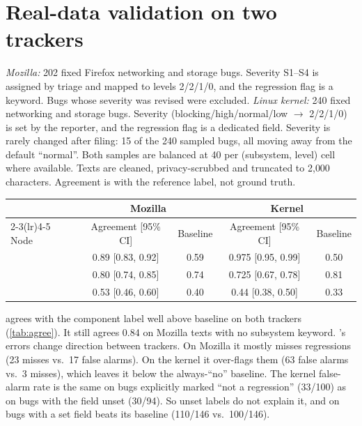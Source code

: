 \section{Real-data validation on two trackers}
\label{sec:real}

 \emph{Mozilla:} 202 fixed Firefox networking and
storage bugs. Severity S1--S4 is assigned by triage and mapped to levels
2/2/1/0, and the regression flag is a keyword. Bugs whose severity was
revised were excluded. \emph{Linux kernel:} 240 fixed networking and
storage bugs. Severity (blocking/high/normal/low $\to$ 2/2/1/0) is set by
the reporter, and the regression flag is a dedicated field. Severity is
rarely changed after filing: 15 of the 240 sampled bugs, all moving away
from the default ``normal''. Both samples are
balanced at 40 per (subsystem, level) cell where available. Texts are
cleaned, privacy-scrubbed and truncated to 2{,}000 characters. Agreement
is with the reference label, not ground truth.

\begin{widetable}
\centering
\caption{Node agreement with reference labels (Wilson intervals). Each
baseline is the most frequent label.}
\label{tab:agree}

\small
\begin{tabular}{lcccc}
\toprule
 & \multicolumn{2}{c}{Mozilla} & \multicolumn{2}{c}{Kernel} \\
\cmidrule(lr){2-3}\cmidrule(lr){4-5}
Node & Agreement [95\% CI] & Baseline & Agreement [95\% CI] & Baseline \\
\midrule
\choice{} & 0.89 [0.83, 0.92] & 0.59 & 0.975 [0.95, 0.99] & 0.50 \\
\noul{}   & 0.80 [0.74, 0.85] & 0.74 & 0.725 [0.67, 0.78] & 0.81 \\
\score{}  & 0.53 [0.46, 0.60] & 0.40 & 0.44 [0.38, 0.50] & 0.33 \\
\bottomrule
\end{tabular}

\end{widetable}

 \choice{} agrees with the component
label well above baseline on both trackers (\cref{tab:agree}). It still
agrees 0.84 on Mozilla texts with no subsystem keyword. \noul{}'s errors
change direction between trackers. On Mozilla it mostly misses
regressions (23 misses vs.\ 17 false alarms). On the kernel it
over-flags them (63 false alarms vs.\ 3 misses), which leaves it below
the always-``no'' baseline. The kernel false-alarm rate is the same on
bugs explicitly marked ``not a regression'' (33/100) as on bugs with the
field unset (30/94). So unset labels do not explain it, and on bugs with
a set field \noul{} beats its baseline (110/146 vs.\ 100/146).

